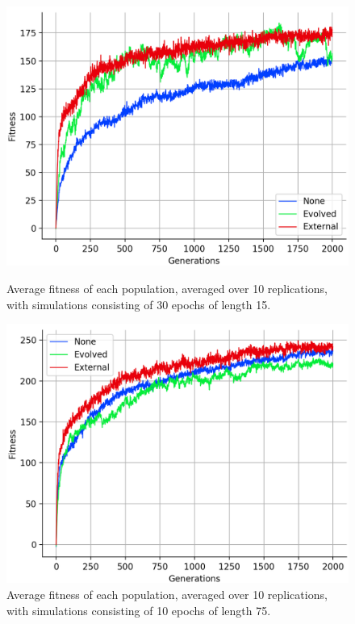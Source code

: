 \documentclass[12pt,a4paper]{report}
\begin{document}
\begin{figure}[t]
   \centering
   \begin{minipage}{0.49\textwidth}
          \centering
          \captionsetup{width=.9\linewidth}
          \includegraphics[width=1.\linewidth]{results/average-short-epo.png}
          \caption{Average fitness of each population, averaged over 10 replications, with simulations consisting of 30 epochs of length 15.}
          \label{fig:average-short-epo}
   \end{minipage}
   \begin{minipage}{0.49\textwidth}
          \centering
          \captionsetup{width=.9\linewidth}
          \includegraphics[width=1.\linewidth]{results/average-long-epo.png}
          \caption{Average fitness of each population, averaged over 10 replications, with simulations consisting of 10 epochs of length 75.}
          \label{fig:average-long-epo}
   \end{minipage}
\end{figure}
\end{document}
